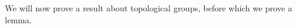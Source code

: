 \documentclass[12pt]{article}
\theoremstyle{definition}
\numberwithin{thm}{section}
\newtheorem{cor}[thm]{Corollary}
\newcommand{\id}{\operatorname{id}}
\newenvironment{blockquote}
{\begin{mdframed}[skipabove=0pt, skipbelow=0pt, innertopmargin=4pt, innerbottommargin=4pt, bottomline=false,topline=false,rightline=false, linewidth=2pt]}
{\end{mdframed}}
\begin{document}

We will now prove a result about topological groups, before which we prove a lemma.
\end{document}

